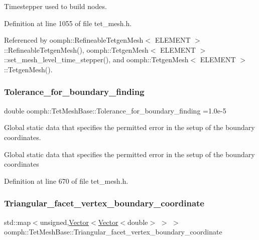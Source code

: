 Timestepper used to build nodes. 



Definition at line 1055 of file tet\+\_\+mesh.\+h.



Referenced by oomph\+::\+Refineable\+Tetgen\+Mesh$<$ E\+L\+E\+M\+E\+N\+T $>$\+::\+Refineable\+Tetgen\+Mesh(), oomph\+::\+Tetgen\+Mesh$<$ E\+L\+E\+M\+E\+N\+T $>$\+::set\+\_\+mesh\+\_\+level\+\_\+time\+\_\+stepper(), and oomph\+::\+Tetgen\+Mesh$<$ E\+L\+E\+M\+E\+N\+T $>$\+::\+Tetgen\+Mesh().

\mbox{\label{classoomph_1_1TetMeshBase_a8ec167eda551633acb8896cb0e87be40}} 
\subsubsection{\texorpdfstring{Tolerance\+\_\+for\+\_\+boundary\+\_\+finding}{Tolerance\_for\_boundary\_finding}}
{\footnotesize\ttfamily double oomph\+::\+Tet\+Mesh\+Base\+::\+Tolerance\+\_\+for\+\_\+boundary\+\_\+finding =1.\+0e-\/5\hspace{0.3cm}{\ttfamily [static]}}



Global static data that specifies the permitted error in the setup of the boundary coordinates. 

Global static data that specifies the permitted error in the setup of the boundary coordinates 

Definition at line 670 of file tet\+\_\+mesh.\+h.

\mbox{\label{classoomph_1_1TetMeshBase_a293595d36c274c03a1cf8d66d233e5ad}} 
\subsubsection{\texorpdfstring{Triangular\+\_\+facet\+\_\+vertex\+\_\+boundary\+\_\+coordinate}{Triangular\_facet\_vertex\_boundary\_coordinate}}
{\footnotesize\ttfamily std\+::map$<$unsigned,\hyperlink{classoomph_1_1Vector}{Vector}$<$\hyperlink{classoomph_1_1Vector}{Vector}$<$double$>$ $>$ $>$ oomph\+::\+Tet\+Mesh\+Base\+::\+Triangular\+\_\+facet\+\_\+vertex\+\_\+boundary\+\_\+coordinate\hspace{0.3cm}{\ttfamily [protected]}}




